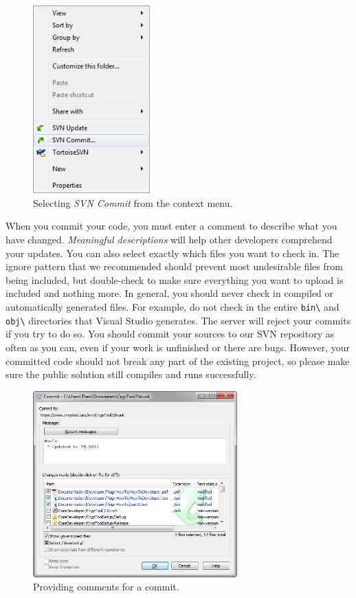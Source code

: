 \begin{figure}[h!]
	\centering
		\includegraphics[width=0.40\textwidth]{figures/tortoise_svn_commit.png}
	\caption{Selecting \textit{SVN Commit} from the context menu.}
	\label{fig:tortoise_svn_commit}
\end{figure}
\clearpage

When you commit your code, you must enter a comment to describe what you have changed. \textit{Meaningful descriptions} will help other developers comprehend your updates. You can also select exactly which files you want to check in. The ignore pattern that we recommended should prevent most undesirable files from being included, but double-check to make sure everything you want to upload is included and nothing more. In general, you should never check in compiled or automatically generated files. For example, do not check in the entire \texttt{bin\textbackslash} and \texttt{obj\textbackslash} directories that Visual Studio generates. The server will reject your commits if you try to do so. You should commit your sources to our SVN repository as often as you can, even if your work is unfinished or there are bugs. However, your committed code should not break any part of the existing project, so please make sure the public solution still compiles and runs successfully.

\begin{figure}[h!]
	\centering
		\includegraphics[width=0.70\textwidth]{figures/tortoise_svn_commit_window.png}
	\caption{Providing comments for a commit.}
	\label{fig:tortoise_svn_commit2}
\end{figure}

